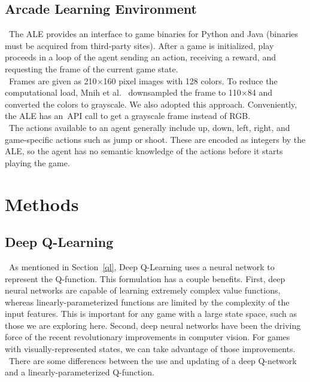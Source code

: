 \documentclass[conference]{IEEEtran}
\begin{document}
\subsection{Arcade Learning Environment}
\noindent\ The ALE provides an interface to game binaries for Python and Java
(binaries must be acquired from third-party sites). After a game is
initialized, play proceeds in a loop of the agent sending an action, receiving
a reward, and requesting the frame of the current game state.\\
\indent\ Frames are given as 210$\times$160 pixel images with 128 colors. To
reduce the computational load, Mnih et al.~\cite{mnih2013playing} downsampled
the frame to 110$\times$84 and converted the colors to grayscale. We also
adopted this approach. Conveniently, the ALE has an\ API call to get a
grayscale frame instead of RGB.\\
\indent\ The actions available to an agent generally include up, down, left,
right, and game-specific actions such as jump or shoot. These are encoded as
integers by the ALE, so the agent has no semantic knowledge of the actions
before it starts playing the game.

\section{Methods}
\subsection{Deep Q-Learning}\label{deep_q}
\noindent\ As mentioned in Section~\ref{ql}, Deep Q-Learning uses a neural
network to represent the Q-function. This formulation has a couple benefits.
First, deep neural networks are capable of learning extremely complex value
functions, whereas linearly-parameterized functions are limited by the
complexity of the input features. This is important for any game with a large
state space, such as those we are exploring here. Second, deep neural networks
have been the driving force of the recent revolutionary improvements in
computer vision. For games with visually-represented states, we can take
advantage of those improvements.\\
\indent\ There are some differences between the use and updating of a deep
Q-network and a linearly-parameterized Q-function.
\end{document}
